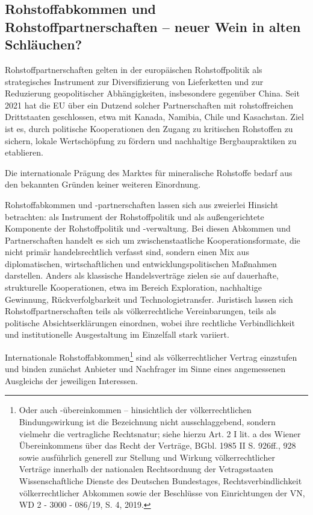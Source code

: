 \documentclass[12pt,a4paper,oneside]{book} %
\begin{document}






\subsection{Rohstoffabkommen und Rohstoffpartnerschaften -- neuer Wein in alten Schläuchen?}
Rohstoffpartnerschaften gelten in der europäischen Rohstoffpolitik als strategisches Instrument zur Diversifizierung von Lieferketten und zur Reduzierung geopolitischer Abhängigkeiten, insbesondere gegenüber China. Seit 2021 hat die EU über ein Dutzend solcher Partnerschaften mit rohstoffreichen Drittstaaten geschlossen, etwa mit Kanada, Namibia, Chile und Kasachstan. Ziel ist es, durch politische Kooperationen den Zugang zu kritischen Rohstoffen zu sichern, lokale Wertschöpfung zu fördern und nachhaltige Bergbaupraktiken zu etablieren.


Die internationale Prägung des Marktes für mineralische Rohstoffe bedarf aus den bekannten Gründen keiner weiteren Einordnung.

Rohstoffabkommen und -partnerschaften lassen sich aus zweierlei Hinsicht betrachten: als Instrument der Rohstoffpolitik und als außengerichtete Komponente der Rohstoffpolitik und -verwaltung. Bei diesen Abkommen und Partnerschaften handelt es sich um zwischenstaatliche Kooperationsformate, die nicht primär handelsrechtlich verfasst sind, sondern einen Mix aus diplomatischen, wirtschaftlichen und entwicklungspolitischen Maßnahmen darstellen. Anders als klassische Handelsverträge zielen sie auf dauerhafte, strukturelle Kooperationen, etwa im Bereich Exploration, nachhaltige Gewinnung, Rückverfolgbarkeit und Technologietransfer. Juristisch lassen sich Rohstoffpartnerschaften teils als völkerrechtliche Vereinbarungen, teils als politische Absichtserklärungen einordnen, wobei ihre rechtliche Verbindlichkeit und institutionelle Ausgestaltung im Einzelfall stark variiert.

Internationale Rohstoffabkommen\footnote{Oder auch -übereinkommen -- hinsichtlich der völkerrechtlichen Bindungswirkung ist die Bezeichnung nicht ausschlaggebend, sondern vielmehr die vertragliche Rechtsnatur; siehe hierzu Art. 2 I lit. a des Wiener Übereinkommens über das Recht der Verträge, BGbl. 1985 II S. 926ff., 928 sowie ausführlich generell zur Stellung und Wirkung völkerrechtlicher Verträge innerhalb der nationalen Rechtsordnung der Vetragsstaaten Wissenschaftliche Dienste des Deutschen Bundestages, Rechtsverbindlichkeit völkerrechtlicher Abkommen sowie der Beschlüsse von Einrichtungen der VN, WD 2 - 3000 - 086/19, S. 4, 2019.} sind als völkerrechtlicher Vertrag einzstufen und binden zunächst Anbieter und Nachfrager im Sinne eines angemessenen Ausgleichs der jeweiligen Interessen.\autocite{Schorkopf, Rn. 43}
\end{document}
